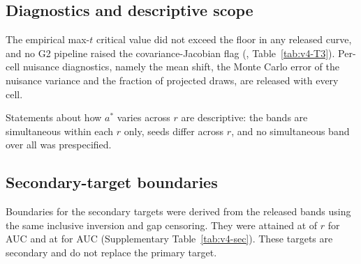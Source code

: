\subsection{Diagnostics and descriptive scope}
The empirical max-$t$ critical value did not exceed the  floor in any released curve, and no G2 pipeline raised the covariance-Jacobian flag (\allunitsresource, Table~\ref{tab:v4-T3}). %
Per-cell nuisance diagnostics, namely the mean shift, the Monte Carlo error of the nuisance variance and the fraction of projected draws, are released with every cell. %

Statements about how $a^*$ varies across $r$ are descriptive: the bands are simultaneous within each $r$ only, seeds differ across $r$, and no simultaneous band over all   was prespecified. %

\subsection*{Secondary-target boundaries}
Boundaries for the secondary targets were derived from the released bands using the same inclusive inversion and gap censoring. They were attained at   of $r$ for AUC  and at  for AUC  (Supplementary Table~\ref{tab:v4-sec}). These targets are secondary and do not replace the primary target. %
